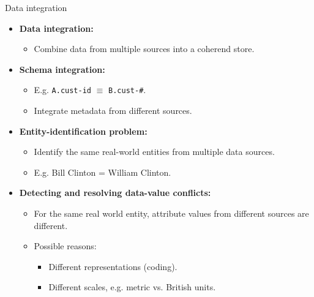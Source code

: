 \documentclass[aspectratio=169,t]{beamer}
\begin{document}
  { 
    \begin{frame}{Data integration}
    \begin{itemize}
       \item \textbf{Data integration:}
       \begin{itemize}
        \item Combine data from multiple sources into a coherend store.
       \end{itemize}
       \item \textbf{Schema integration:}
       \begin{itemize}
        \item E.g. \texttt{A.cust-id} $\equiv$ \texttt{B.cust-\#}.
        \item Integrate metadata from different sources.
       \end{itemize}
       \item \textbf{Entity-identification problem:}
       \begin{itemize}
        \item Identify the same real-world entities from multiple data sources.
        \item E.g. Bill Clinton = William Clinton.
       \end{itemize}
       \item \textbf{Detecting and resolving {\color{airforceblue}data-value conflicts}:}
       \begin{itemize}
        \item For the same real world entity, attribute values from different sources are different.
        \item Possible reasons:
        \begin{itemize}
          \item Different representations (coding).
          \item Different scales, e.g. metric vs. British units.
        \end{itemize}
       \end{itemize}
    \end{itemize}
    \end{frame}
  }
\end{document}

